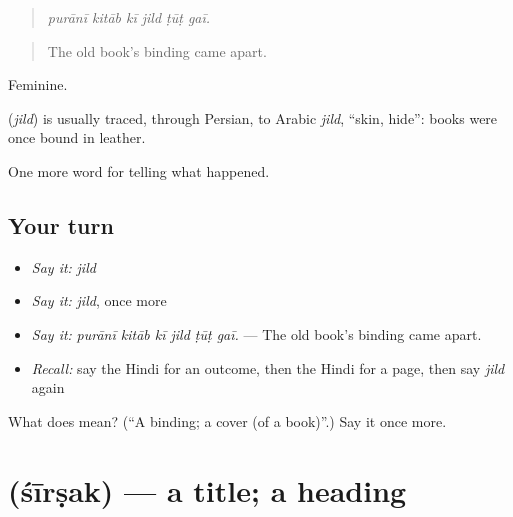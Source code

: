 \begin{quote}
     
\end{quote}

\begin{quote}
\emph{purānī kitāb kī jild ṭūṭ gaī.}
\end{quote}

\begin{quote}
The old book's binding came apart.
\end{quote}

Feminine.

\begin{cousinweb}
\textbf{} (\emph{jild}) is usually traced, through Persian, to Arabic \emph{jild}, \textquotedblleft{}skin, hide\textquotedblright{}: books were once bound in leather.
\end{cousinweb}

\begin{grammarlens}[title={What you've built}]
One more word for telling what happened.
\end{grammarlens}

\subsection*{Your turn}
\begin{itemize}
\raggedright
  \item \emph{Say it:} \emph{jild}
  \item \emph{Say it:} \emph{jild}, once more
  \item \emph{Say it:} \emph{purānī kitāb kī jild ṭūṭ gaī.} — The old book's binding came apart.
  \item \emph{Recall:} say the Hindi for an outcome, then the Hindi for a page, then say \emph{jild} again
\end{itemize}

\begin{tcolorbox}[breakable,colback=teal!4,colframe=teal!35!black,title={Before you move on}]
What does  mean? (\textquotedblleft{}A binding; a cover (of a book)\textquotedblright{}.) Say it once more.
\end{tcolorbox}
\section[\texorpdfstring{\hi{शीर्षक} (śīrṣak)}{शीर्षक (śīrṣak)}]{ (śīrṣak) — a title; a heading}

\label{lesson:HI-C341-sirsak}



